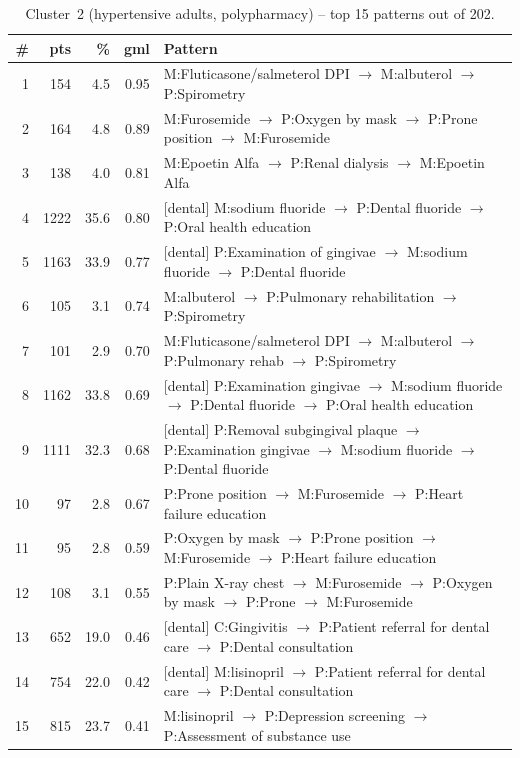 \begin{table}[H]
\centering
\footnotesize
\setlength{\arraystretch}{1.05}
\begin{tabular}{@{}r r r r p{9.5cm}@{}}
\toprule
\# & pts & \% & gml & Pattern \\
\midrule
1  &  154 &  4.5 & 0.95 & M:Fluticasone/salmeterol DPI $\to$ M:albuterol $\to$ P:Spirometry \\
2  &  164 &  4.8 & 0.89 & M:Furosemide $\to$ P:Oxygen by mask $\to$ P:Prone position $\to$ M:Furosemide \\
3  &  138 &  4.0 & 0.81 & M:Epoetin Alfa $\to$ P:Renal dialysis $\to$ M:Epoetin Alfa \\
4  & 1222 & 35.6 & 0.80 & [dental] M:sodium fluoride $\to$ P:Dental fluoride $\to$ P:Oral health education \\
5  & 1163 & 33.9 & 0.77 & [dental] P:Examination of gingivae $\to$ M:sodium fluoride $\to$ P:Dental fluoride \\
6  &  105 &  3.1 & 0.74 & M:albuterol $\to$ P:Pulmonary rehabilitation $\to$ P:Spirometry \\
7  &  101 &  2.9 & 0.70 & M:Fluticasone/salmeterol DPI $\to$ M:albuterol $\to$ P:Pulmonary rehab $\to$ P:Spirometry \\
8  & 1162 & 33.8 & 0.69 & [dental] P:Examination gingivae $\to$ M:sodium fluoride $\to$ P:Dental fluoride $\to$ P:Oral health education \\
9  & 1111 & 32.3 & 0.68 & [dental] P:Removal subgingival plaque $\to$ P:Examination gingivae $\to$ M:sodium fluoride $\to$ P:Dental fluoride \\
10 &   97 &  2.8 & 0.67 & P:Prone position $\to$ M:Furosemide $\to$ P:Heart failure education \\
11 &   95 &  2.8 & 0.59 & P:Oxygen by mask $\to$ P:Prone position $\to$ M:Furosemide $\to$ P:Heart failure education \\
12 &  108 &  3.1 & 0.55 & P:Plain X-ray chest $\to$ M:Furosemide $\to$ P:Oxygen by mask $\to$ P:Prone $\to$ M:Furosemide \\
13 &  652 & 19.0 & 0.46 & [dental] C:Gingivitis $\to$ P:Patient referral for dental care $\to$ P:Dental consultation \\
14 &  754 & 22.0 & 0.42 & [dental] M:lisinopril $\to$ P:Patient referral for dental care $\to$ P:Dental consultation \\
15 &  815 & 23.7 & 0.41 & M:lisinopril $\to$ P:Depression screening $\to$ P:Assessment of substance use \\
\bottomrule
\end{tabular}
\caption{Cluster~2 (hypertensive adults, polypharmacy) -- top 15 patterns out of 202.}
\label{tab:ch6_seq_c2}
\end{table}

